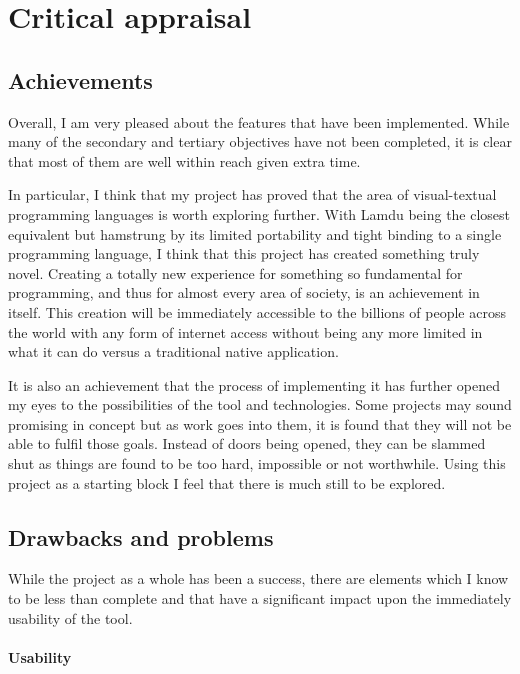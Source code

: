 \section{Critical appraisal}

\subsection{Achievements}

Overall, I am very pleased about the features that have been implemented. While many of the secondary and tertiary objectives have not been completed, it is clear that most of them are well within reach given extra time.

In particular, I think that my project has proved that the area of visual-textual programming languages is worth exploring further. With Lamdu being the closest equivalent but hamstrung by its limited portability and tight binding to a single programming language, I think that this project has created something truly novel. Creating a totally new experience for something so fundamental for programming, and thus for almost every area of society, is an achievement in itself. This creation will be immediately accessible to the billions of people across the world with any form of internet access without being any more limited in what it can do versus a traditional native application. 

It is also an achievement that the process of implementing it has further opened my eyes to the possibilities of the tool and technologies. Some projects may sound promising in concept but as work goes into them, it is found that they will not be able to fulfil those goals. Instead of doors being opened, they can be slammed shut as things are found to be too hard, impossible or not worthwhile. Using this project as a starting block I feel that there is much still to be explored.

\subsection{Drawbacks and problems}

While the project as a whole has been a success, there are elements which I know to be less than complete and that have a significant impact upon the immediately usability of the tool.

\paragraph{Usability}

